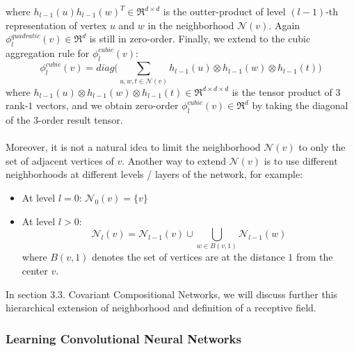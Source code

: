 \documentclass[a4paper]{article}
\begin{document}
where $h_{l - 1}(u) h_{l - 1}(w)^T \in \Re^{d \times d}$ is the outter-product of level $(l - 1)$-th representation of vertex $u$ and $w$ in the neighborhood $\mathcal{N}(v)$. Again $\phi_l^{quadratic}(v) \in \Re^d$ is still in zero-order. Finally, we extend to the cubic aggregation rule for $\phi_l^{cubic}(v)$:
$$\phi_l^{cubic}(v) = diag \bigg( \sum\limits_{u, w, t \in \mathcal{N}(v)} h_{l - 1}(u) \otimes h_{l - 1}(w) \otimes h_{l - 1}(t) \bigg)$$
where $h_{l - 1}(u) \otimes h_{l - 1}(w) \otimes h_{l - 1}(t) \in \Re^{d \times d \times d}$ is the tensor product of $3$ rank-$1$ vectors, and we obtain zero-order $\phi_l^{cubic}(v) \in \Re^d$ by taking the diagonal of the $3$-order result tensor. \\ \\
Moreover, it is not a natural idea to limit the neighborhood $\mathcal{N}(v)$ to only the set of adjacent vertices of $v$. Another way to extend $\mathcal{N}(v)$ is to use different neighborhoods at different levels / layers of the network, for example:
\begin{itemize}
	\item At level $l = 0$: $\mathcal{N}_0(v) = \{v\}$
	\item At level $l > 0$: 
	$$\mathcal{N}_l(v) = \mathcal{N}_{l - 1}(v) \cup \bigcup_{w \in B(v, 1)} \mathcal{N}_{l - 1}(w)$$
	where $B(v, 1)$ denotes the set of vertices are at the distance $1$ from the center $v$.
\end{itemize}
In section 3.3. Covariant Compositional Networks, we will discuss further this hierarchical extension of neighborhood and definition of a receptive field.

\subsubsection{Learning Convolutional Neural Networks \cite{Niepert}}
\end{document}
